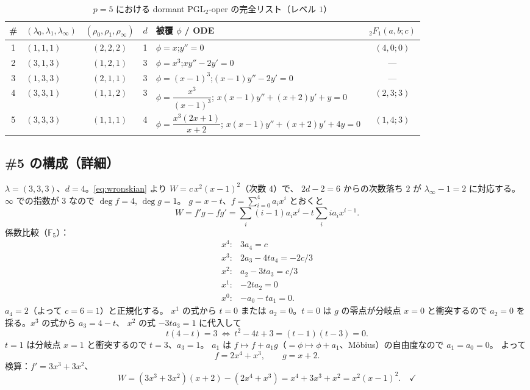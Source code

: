 \documentclass[a4paper,11pt]{ltjsarticle}
\theoremstyle{plain}
\theoremstyle{definition}
\newcommand{\bbF}{\mathbb{F}}
\begin{document}
\begin{table}[htbp]
\centering
\caption{$p=5$ における dormant $\mathrm{PGL}_2$-oper の完全リスト（レベル $1$）}
\label{tab:p5}
\small
\begin{tabular}{clcclc}
\toprule
\# & $(\lambda_0,\lambda_1,\lambda_\infty)$ & $(\rho_0,\rho_1,\rho_\infty)$ & $d$
   & 被覆 $\phi$ / ODE & ${}_2F_1(a,b;c)$\\
\midrule
1 & $(1,1,1)$ & $(2,2,2)$ & 1 & $\phi=x$;\quad $y''=0$ & $(4,0;0)$\\[2pt]
2 & $(3,1,3)$ & $(1,2,1)$ & 3 & $\phi=x^3$;\quad $xy''-2y'=0$ & ---\\[2pt]
3 & $(1,3,3)$ & $(2,1,1)$ & 3 & $\phi=(x-1)^3$;\quad $(x-1)y''-2y'=0$ & ---\\[2pt]
4 & $(3,3,1)$ & $(1,1,2)$ & 3 & $\phi=\dfrac{x^3}{(x-1)^3}$;\quad
      $x(x-1)y''+(x+2)y'+y=0$ & $(2,3;3)$\\[8pt]
5 & $(3,3,3)$ & $(1,1,1)$ & 4 & $\phi=\dfrac{x^3(2x+1)}{x+2}$;\quad
      $x(x-1)y''+(x+2)y'+4y=0$ & $(1,4;3)$\\
\bottomrule
\end{tabular}
\end{table}

\subsection{\#5 の構成（詳細）}\label{ss:no5}

$\lambda=(3,3,3)$、$d=4$。\eqref{eq:wronskian} より $W=c\,x^2(x-1)^2$（次数 $4$）で、
$2d-2=6$ からの次数落ち $2$ が $\lambda_\infty-1=2$ に対応する。
$\infty$ での指数が $3$ なので $\deg f=4$, $\deg g=1$。
$g=x-t$、$f=\sum_{i=0}^4a_ix^i$ とおくと
\[
  W=f'g-fg'=\sum_i(i-1)a_ix^i-t\sum_i ia_ix^{i-1} .
\]
係数比較（$\bbF_5$）：
\[
  \begin{array}{ll}
  x^4:&3a_4=c\\
  x^3:&2a_3-4ta_4=-2c/3\\
  x^2:&a_2-3ta_3=c/3\\
  x^1:&-2ta_2=0\\
  x^0:&-a_0-ta_1=0 .
  \end{array}
\]
$a_4=2$（よって $c=6=1$）と正規化する。
$x^1$ の式から $t=0$ または $a_2=0$。$t=0$ は $g$ の零点が分岐点 $x=0$ と衝突するので
$a_2=0$ を採る。$x^3$ の式から $a_3=4-t$、
$x^2$ の式 $-3ta_3=1$ に代入して
\[
  t(4-t)=3\ \Longleftrightarrow\ t^2-4t+3=(t-1)(t-3)=0 .
\]
$t=1$ は分岐点 $x=1$ と衝突するので $t=3$、$a_3=1$。
$a_1$ は $f\mapsto f+a_1g$（$=\phi\mapsto\phi+a_1$、Möbius）の自由度なので $a_1=a_0=0$。
よって
\[
  f=2x^4+x^3,\qquad g=x+2 .
\]
検算：$f'=3x^3+3x^2$、
\[
  W=(3x^3+3x^2)(x+2)-(2x^4+x^3)=x^4+3x^3+x^2=x^2(x-1)^2 .\quad\checkmark
\]
\end{document}
